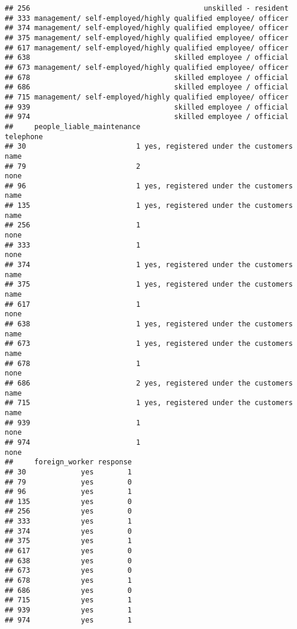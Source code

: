 \documentclass[
]{article}
\begin{document}
\begin{verbatim}
## 256                                         unskilled - resident
## 333 management/ self-employed/highly qualified employee/ officer
## 374 management/ self-employed/highly qualified employee/ officer
## 375 management/ self-employed/highly qualified employee/ officer
## 617 management/ self-employed/highly qualified employee/ officer
## 638                                  skilled employee / official
## 673 management/ self-employed/highly qualified employee/ officer
## 678                                  skilled employee / official
## 686                                  skilled employee / official
## 715 management/ self-employed/highly qualified employee/ officer
## 939                                  skilled employee / official
## 974                                  skilled employee / official
##     people_liable_maintenance                                telephone
## 30                          1 yes, registered under the customers name
## 79                          2                                     none
## 96                          1 yes, registered under the customers name
## 135                         1 yes, registered under the customers name
## 256                         1                                     none
## 333                         1                                     none
## 374                         1 yes, registered under the customers name
## 375                         1 yes, registered under the customers name
## 617                         1                                     none
## 638                         1 yes, registered under the customers name
## 673                         1 yes, registered under the customers name
## 678                         1                                     none
## 686                         2 yes, registered under the customers name
## 715                         1 yes, registered under the customers name
## 939                         1                                     none
## 974                         1                                     none
##     foreign_worker response
## 30             yes        1
## 79             yes        0
## 96             yes        1
## 135            yes        0
## 256            yes        0
## 333            yes        1
## 374            yes        0
## 375            yes        1
## 617            yes        0
## 638            yes        0
## 673            yes        0
## 678            yes        1
## 686            yes        0
## 715            yes        1
## 939            yes        1
## 974            yes        1
\end{verbatim}
\end{document}
